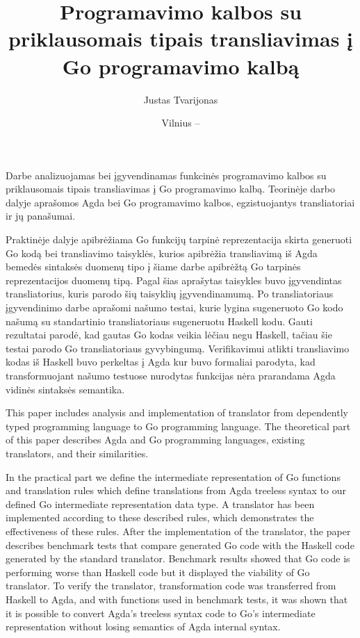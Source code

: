 \documentclass{VUMIFPSbakalaurinis}
\title{Programavimo kalbos su priklausomais tipais transliavimas į Go programavimo kalbą}
\author{Justas Tvarijonas}
\date{Vilnius – \the\year}
\begin{document}
\maketitle

Darbe analizuojamas bei įgyvendinamas funkcinės programavimo kalbos su priklausomais tipais transliavimas į Go programavimo kalbą. Teorinėje darbo dalyje aprašomos Agda bei Go programavimo kalbos, egzistuojantys transliatoriai ir jų panašumai. 
\par Praktinėje dalyje apibrėžiama Go funkcijų tarpinė reprezentacija skirta generuoti Go kodą bei transliavimo taisyklės, kurios apibrėžia transliavimą iš Agda bemedės sintaksės duomenų tipo į šiame darbe apibrėžtą Go tarpinės reprezentacijos duomenų tipą. Pagal šias aprašytas taisykles buvo įgyvendintas transliatorius, kuris parodo šių taisyklių įgyvendinamumą. Po transliatoriaus įgyvendinimo darbe aprašomi našumo testai, kurie lygina sugeneruoto Go kodo našumą su standartinio transliatoriaus sugeneruotu Haskell kodu. Gauti rezultatai parodė, kad gautas Go kodas veikia lėčiau negu Haskell, tačiau šie testai parodo Go transliatoriaus gyvybingumą. Verifikavimui atlikti transliavimo kodas iš Haskell buvo perkeltas į Agda kur buvo formaliai parodyta, kad transformuojant našumo testuose nurodytas funkcijas nėra prarandama Agda vidinės sintaksės semantika.

This paper includes analysis and implementation of translator from dependently typed programming language to Go programming language. The theoretical part of this paper describes Agda and Go programming languages, existing translators, and their similarities. 
\par In the practical part we define the intermediate representation of Go functions and translation rules which define translations from Agda treeless syntax to our defined Go intermediate representation data type. A translator has been implemented according to these described rules, which demonstrates the effectiveness of these rules. After the implementation of the translator, the paper describes benchmark tests that compare generated Go code with the Haskell code generated by the standard translator. Benchmark results showed that Go code is performing worse than Haskell code but it displayed the viability of Go translator. To verify the translator, transformation code was transferred from Haskell to Agda, and with functions used in benchmark tests, it was shown that it is possible to convert Agda's treeless syntax code to Go's intermediate representation without losing semantics of Agda internal syntax.
\end{document}
